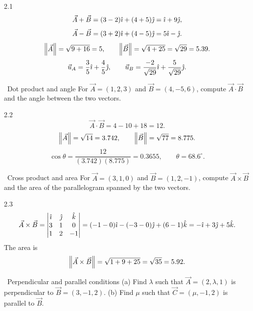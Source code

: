 \begin{tabletworkspace}[6.5cm]
\end{tabletworkspace}

\begin{solution}{2.1}
\[
\vec A+\vec B=(3-2)\hat{\imath}+(4+5)\hat{\jmath}=\hat{\imath}+9\hat{\jmath},
\]
\[
\vec A-\vec B=(3+2)\hat{\imath}+(4-5)\hat{\jmath}=5\hat{\imath}-\hat{\jmath}.
\]
\[
\left\lVert \vec A \right\rVert=\sqrt{9+16}=5,\qquad \left\lVert \vec B \right\rVert=\sqrt{4+25}=\sqrt{29}=5.39.
\]
\[
\vec u_A=\frac{3}{5}\hat{\imath}+\frac{4}{5}\hat{\jmath},\qquad
\vec u_B=\frac{-2}{\sqrt{29}}\hat{\imath}+\frac{5}{\sqrt{29}}\hat{\jmath}.
\]
\end{solution}

\begin{exercise}{\warm\ Dot product and angle}
For $\vec A=(1,2,3)$ and $\vec B=(4,-5,6)$, compute $\vec A\cdot\vec B$ and the
angle between the two vectors.
\end{exercise}

\begin{tabletworkspace}[6.5cm]
\end{tabletworkspace}

\begin{solution}{2.2}
\[
\vec A\cdot\vec B=4-10+18=12.
\]
\[
\left\lVert \vec A \right\rVert=\sqrt{14}=3.742,\qquad \left\lVert \vec B \right\rVert=\sqrt{77}=8.775.
\]
\[
\cos\theta=\frac{12}{(3.742)(8.775)}=0.3655,
\qquad \theta=68.6^\circ.
\]
\end{solution}

\begin{exercise}{\warm\ Cross product and area}
For $\vec A=(3,1,0)$ and $\vec B=(1,2,-1)$, compute $\vec A\times\vec B$ and the
area of the parallelogram spanned by the two vectors.
\end{exercise}

\begin{tabletworkspace}[6.5cm]
\end{tabletworkspace}

\begin{solution}{2.3}
\[
\vec A\times\vec B=
\begin{vmatrix}
\hat{\imath}&\hat{\jmath}&\hat{k}\\
3&1&0\\
1&2&-1
\end{vmatrix}
=(-1-0)\hat{\imath}-( -3-0)\hat{\jmath}+(6-1)\hat{k}
=-\hat{\imath}+3\hat{\jmath}+5\hat{k}.
\]
The area is
\[
\left\lVert \vec A\times\vec B \right\rVert=\sqrt{1+9+25}=\sqrt{35}=5.92.
\]
\end{solution}

\begin{exercise}{\core\ Perpendicular and parallel conditions}
(a) Find $\lambda$ such that $\vec A=(2,\lambda,1)$ is perpendicular to
$\vec B=(3,-1,2)$. (b) Find $\mu$ such that $\vec C=(\mu,-1,2)$ is parallel to
$\vec B$.
\end{exercise}

